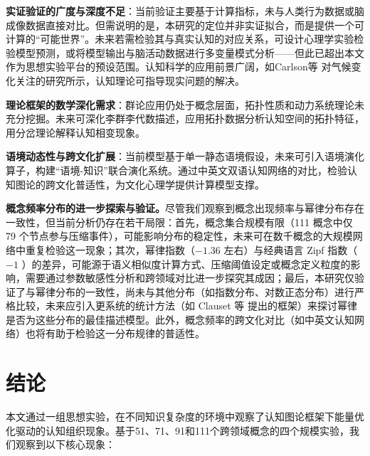 \documentclass[12pt,a4paper]{article}
\begin{document}
\textbf{实证验证的广度与深度不足}：当前验证主要基于计算指标，未与人类行为数据或脑成像数据直接对比。但需说明的是，本研究的定位并非实证拟合，而是提供一个可计算的“可能世界”。未来若需检验其与真实认知的对应关系，可设计心理学实验检验模型预测，或将模型输出与脑活动数据进行多变量模式分析——但此已超出本文作为思想实验平台的预设范围。认知科学的应用前景广阔，如Carlson等 \cite{carlson2025attending} 对气候变化关注的研究所示，认知理论可指导现实问题的解决。

\textbf{理论框架的数学深化需求}：群论应用仍处于概念层面，拓扑性质和动力系统理论未充分挖掘。未来可深化李群李代数描述，应用拓扑数据分析认知空间的拓扑特征，用分岔理论解释认知相变现象。

\textbf{语境动态性与跨文化扩展}：当前模型基于单一静态语境假设，未来可引入语境演化算子，构建“语境-知识”联合演化系统。通过中英文双语认知网络的对比，检验认知图论的跨文化普适性，为文化心理学提供计算模型支撑。

\textbf{概念频率分布的进一步探索与验证。}尽管我们观察到概念出现频率与幂律分布存在一致性，但当前分析仍存在若干局限：首先，概念集合规模有限（111 概念中仅 79 个节点参与压缩事件），可能影响分布的稳定性，未来可在数千概念的大规模网络中重复检验这一现象；其次，幂律指数（$-1.36$ 左右）与经典语言 Zipf 指数（$-1$ \citep{zipf1949human}）的差异，可能源于语义相似度计算方式、压缩阈值设定或概念定义粒度的影响，需要通过参数敏感性分析和跨领域对比进一步探究其成因；最后，本研究仅验证了与幂律分布的一致性，尚未与其他分布（如指数分布、对数正态分布）进行严格比较，未来应引入更系统的统计方法（如 Clauset 等 \citep{clauset2009power} 提出的框架）来探讨幂律是否为这些分布的最佳描述模型。此外，概念频率的跨文化对比（如中英文认知网络）也将有助于检验这一分布规律的普适性。

\section{结论}

本文通过一组思想实验，在不同知识复杂度的环境中观察了认知图论框架下能量优化驱动的认知组织现象。基于51、71、91和111个跨领域概念的四个规模实验，我们观察到以下核心现象：
\end{document}
